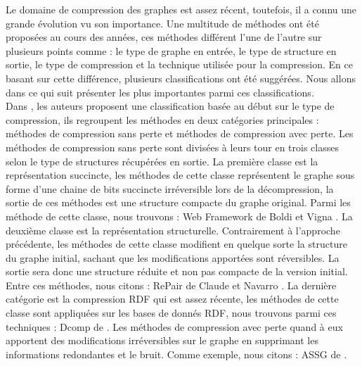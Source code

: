 Le domaine de compression des graphes est assez récent, toutefois, il a connu une grande évolution vu son importance. Une multitude de méthodes ont été proposées au cours des années, ces méthodes différent l'une de l'autre sur plusieurs points comme : le type de graphe en entrée, le type de structure en sortie, le type de compression et la technique utilisée pour la compression. En ce basant sur cette différence, plusieurs classifications ont été suggérées. Nous allons dans ce qui suit présenter les plus importantes parmi ces classifications.\\

Dans \citep{maneth2015survey}, les auteurs proposent une classification basée au début sur le type de compression, ils regroupent les méthodes en deux catégories principales : méthodes de compression sans perte et méthodes de compression avec perte. Les méthodes de compression sans perte sont divisées à leurs tour en trois classes selon le type de structures récupérées en sortie. La première classe est la représentation succincte, les méthodes de cette classe représentent le graphe sous forme d'une chaine de bits succincte irréversible lors de la décompression, la sortie de ces méthodes est une structure compacte du graphe original. Parmi les méthode de cette classe, nous trouvons : Web Framework de Boldi et Vigna \citep{boldi2004webgraph}. La deuxième classe est la représentation structurelle. Contrairement à l'approche précédente, les méthodes de cette classe modifient en quelque sorte la structure du graphe initial, sachant que les modifications apportées sont réversibles. La sortie sera donc une structure réduite et non pas compacte de la version initial. Entre ces méthodes, nous citons : RePair de Claude et Navarro \citep{claude2010fas}. La dernière catégorie est la compression RDF qui est assez récente, les méthodes de cette classe sont appliquées sur les bases de donnés RDF, nous trouvons parmi ces techniques : Dcomp de \citep{martinez2012compression} . Les méthodes de compression avec perte quand à eux apportent des modifications irréversibles sur le graphe en supprimant les informations redondantes et le bruit. Comme exemple, nous citons : ASSG de \citep{zhang2014assg}.\\

